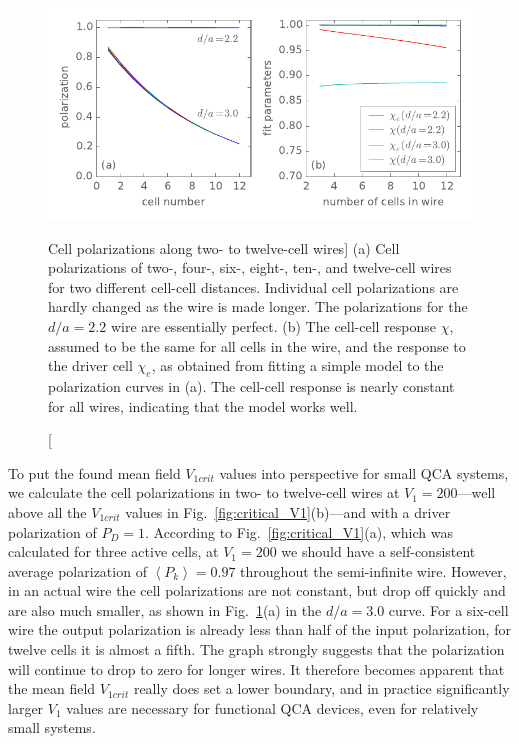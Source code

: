 \begin{figure}
  \center
  \includegraphics{wire_polarization}
  \caption
  [Cell polarizations along two- to twelve-cell wires]
  {
  (a) Cell polarizations of two-, four-, six-, eight-, ten-, and twelve-cell
  wires for two different cell-cell distances. Individual cell polarizations are
  hardly changed as the wire is made longer. The polarizations for the $d/a =
  2.2$ wire are essentially perfect.
  (b) The cell-cell response $\chi$, assumed to be the same for all cells in the
  wire, and the response to the driver cell $\chi_e$, as obtained from fitting a
  simple model to the polarization curves in (a). The cell-cell response is
  nearly constant for all wires, indicating that the model works well.
  }
  \label{fig:wire_polarization}
\end{figure}

To put the found mean field $V_{1crit}$ values into perspective for small QCA
systems, we calculate the cell polarizations in two- to twelve-cell wires at
$V_1 = 200$---well above all the $V_{1crit}$ values in
Fig.~\ref{fig:critical_V1}(b)---and with a driver polarization of $P_D = 1$.
According to Fig.~\ref{fig:critical_V1}(a), which was calculated for three
active cells, at $V_1 = 200$ we should have a self-consistent average
polarization of $\left< P_k \right> = 0.97$ throughout the semi-infinite wire.
However, in an actual wire the cell polarizations are not constant, but drop off
quickly and are also much smaller, as shown in
Fig.~\ref{fig:wire_polarization}(a) in the $d/a = 3.0$ curve. For a six-cell
wire the output polarization is already less than half of the input
polarization, for twelve cells it is almost a fifth. The graph strongly suggests
that the polarization will continue to drop to zero for longer wires.  It
therefore becomes apparent that the mean field $V_{1crit}$ really does set a
lower boundary, and in practice significantly larger $V_1$ values are necessary
for functional QCA devices, even for relatively small systems.

